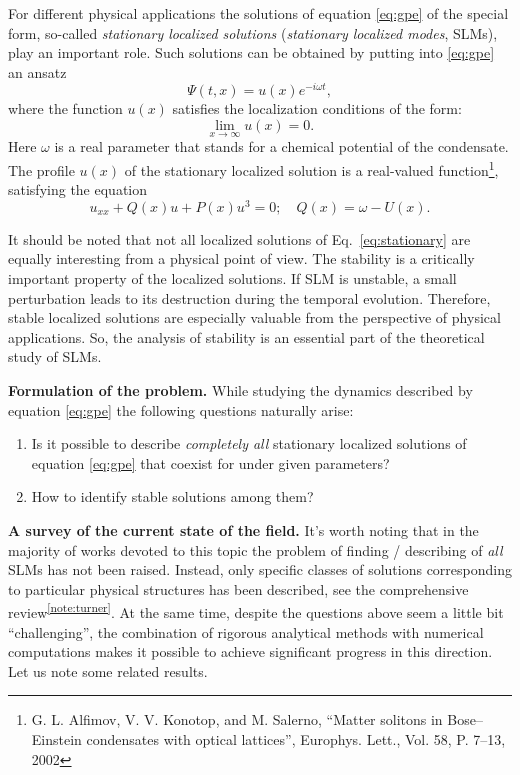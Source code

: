 \documentclass[candidate, href, colorlinks]{disser}
\begin{document}

For different physical applications the solutions of equation \eqref{eq:gpe} of the special form, so-called {\it stationary localized solutions} ({\it stationary localized modes}, SLMs), play an important role.
Such solutions can be obtained by putting into \eqref{eq:gpe} an ansatz
\begin{equation}
	\Psi(t, x) = u(x) e^{-i \omega t},
\label{eq:ansatz}
\end{equation}
where the function $u(x)$ satisfies the localization conditions of the form:
\begin{equation}
	\lim \limits_{x \to \infty} u(x) = 0.
\label{eq:localization}
\end{equation}
Here $\omega$ is a real parameter that stands for a chemical potential of the condensate.
The profile $u(x)$ of the stationary localized solution is a real-valued function\footnote{G. L. Alfimov, V. V. Konotop, and M. Salerno, ``Matter solitons in Bose--Einstein condensates with optical lattices'', Europhys. Lett., Vol. 58, P. 7--13, 2002}, satisfying the equation
\begin{equation}
	u_{xx} + Q(x) u + P(x) u^3 = 0; \quad Q(x) = \omega - U(x).
\label{eq:stationary}
\end{equation}

It should be noted that not all localized solutions of Eq.~\eqref{eq:stationary} are equally interesting from a physical point of view.
The stability is a critically important property of the localized solutions.
If SLM is unstable, a small perturbation leads to its destruction during the temporal evolution.
Therefore, stable localized solutions are especially valuable from the perspective of physical applications.
So, the analysis of stability is an essential part of the theoretical study of SLMs.

\textbf{Formulation of the problem.}
While studying the dynamics described by equation \eqref{eq:gpe} the following questions naturally arise:
\begin{enumerate}
	\item Is it possible to describe {\it completely all} stationary localized solutions of equation \eqref{eq:gpe} that coexist for under given parameters?
	\item How to identify stable solutions among them?
\end{enumerate}

\textbf{A survey of the current state of the field.}
It's worth noting that in the majority of works devoted to this topic the problem of finding / describing of {\it all} SLMs has not been raised.
Instead, only specific classes of solutions corresponding to particular physical structures has been described, see the comprehensive review\textsuperscript{\ref{note:turner}}.
At the same time, despite the questions above seem a little bit ``challenging'', the combination of rigorous analytical methods with numerical computations makes it possible to achieve significant progress in this direction.
Let us note some related results.
\end{document}
